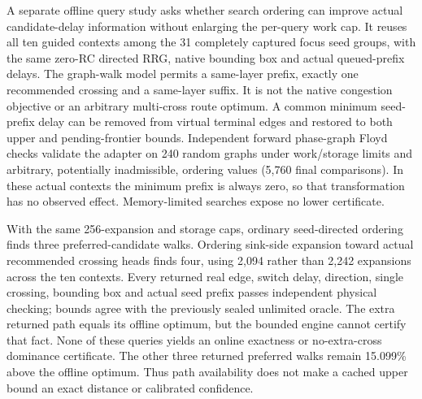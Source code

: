 A separate offline query study asks whether search ordering can improve actual candidate-delay information without enlarging the per-query work cap. It reuses all ten guided contexts among the 31 completely captured focus seed groups, with the same zero-RC directed RRG, native bounding box and actual queued-prefix delays. The graph-walk model permits a same-layer prefix, exactly one recommended crossing and a same-layer suffix. It is not the native congestion objective or an arbitrary multi-cross route optimum. A common minimum seed-prefix delay can be removed from virtual terminal edges and restored to both upper and pending-frontier bounds. Independent forward phase-graph Floyd checks validate the adapter on 240 random graphs under work/storage limits and arbitrary, potentially inadmissible, ordering values (5,760 final comparisons). In these actual contexts the minimum prefix is always zero, so that transformation has no observed effect. Memory-limited searches expose no lower certificate.

With the same 256-expansion and storage caps, ordinary seed-directed ordering finds three preferred-candidate walks. Ordering sink-side expansion toward actual recommended crossing heads finds four, using 2,094 rather than 2,242 expansions across the ten contexts. Every returned real edge, switch delay, direction, single crossing, bounding box and actual seed prefix passes independent physical checking; bounds agree with the previously sealed unlimited oracle. The extra returned path equals its offline optimum, but the bounded engine cannot certify that fact. None of these queries yields an online exactness or no-extra-cross dominance certificate. The other three returned preferred walks remain 15.099\% above the offline optimum. Thus path availability does not make a cached upper bound an exact distance or calibrated confidence.

